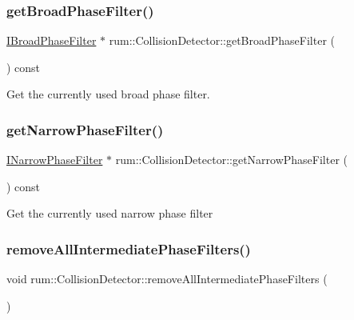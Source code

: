\subsubsection{\texorpdfstring{get\+Broad\+Phase\+Filter()}{getBroadPhaseFilter()}}
{\footnotesize\ttfamily \mbox{\hyperlink{classrum_1_1_i_broad_phase_filter}{I\+Broad\+Phase\+Filter}} $\ast$ rum\+::\+Collision\+Detector\+::get\+Broad\+Phase\+Filter (\begin{DoxyParamCaption}{ }\end{DoxyParamCaption}) const}

Get the currently used broad phase filter. \mbox{\label{classrum_1_1_collision_detector_a804d2926d30afa1e45629643b1262b64}} 
\subsubsection{\texorpdfstring{get\+Narrow\+Phase\+Filter()}{getNarrowPhaseFilter()}}
{\footnotesize\ttfamily \mbox{\hyperlink{classrum_1_1_i_narrow_phase_filter}{I\+Narrow\+Phase\+Filter}} $\ast$ rum\+::\+Collision\+Detector\+::get\+Narrow\+Phase\+Filter (\begin{DoxyParamCaption}{ }\end{DoxyParamCaption}) const}

Get the currently used narrow phase filter \mbox{\label{classrum_1_1_collision_detector_a378bc34c76126678e5ad0ef801d9a0d6}} 
\subsubsection{\texorpdfstring{remove\+All\+Intermediate\+Phase\+Filters()}{removeAllIntermediatePhaseFilters()}}
{\footnotesize\ttfamily void rum\+::\+Collision\+Detector\+::remove\+All\+Intermediate\+Phase\+Filters (\begin{DoxyParamCaption}{ }\end{DoxyParamCaption})}

